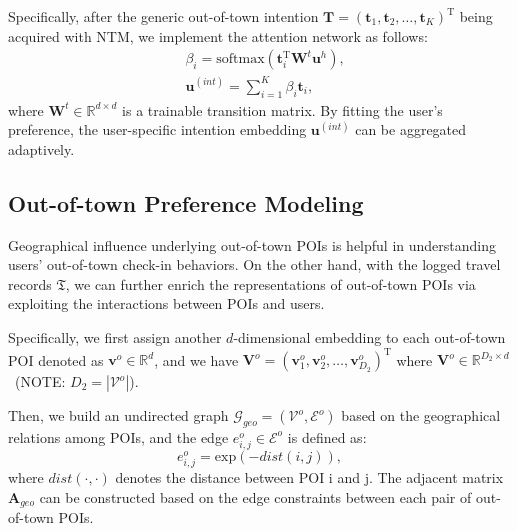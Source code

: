 \documentclass[letterpaper]{article} %
\begin{document}
Specifically, after the generic out-of-town intention 
$\mathbf{T} = 
\left(
{\mathbf{t}_1,\mathbf{t}_2,\ldots,\mathbf{t}_{K}}
\right)^{\mathrm{T}}$ being acquired with NTM, we implement the attention network as follows:
\begin{equation}\label{e:intention_embedding}
    \begin{split}
        & \beta_i = \mathrm{softmax}\left(
        \mathbf{t}_i^\mathrm{T} 
        \mathbf{W}^t
        \mathbf{u}^h
        \right)  ,
        \\
        & \mathbf{u}^{(int)} = \sum_{i=1}^{K}
        \beta_i \mathbf{t}_i  ,
    \end{split}
\end{equation}
%
where $\mathbf{W}^t \in \mathbb{R}^{d \times d}$ is a trainable transition matrix. 
By fitting the user's preference, the {user-specific} intention embedding $\mathbf{u}^{(int)}$ can be aggregated adaptively. 


\subsection{Out-of-town Preference Modeling} 
Geographical influence underlying out-of-town POIs is helpful in understanding users' out-of-town check-in behaviors. 
On the other hand, with the logged travel records $ \mathfrak{T} $, we can further enrich the representations of out-of-town POIs via exploiting the interactions between POIs and users.

Specifically, 
we first assign another $d$-dimensional embedding to each out-of-town POI denoted as $\mathbf{v}^o \in \mathbb{R}^d$,
and we have $\mathbf{V}^o = {\left(\mathbf{v}^o_1, \mathbf{v}^o_2, \ldots, \mathbf{v}^o_{D_2}\right)}^{\mathrm{T}}$ 
where 
$\mathbf{V}^o \in \mathbb{R}^{D_2 \times d}$~(NOTE: $D_2 = |\mathcal{V}^o|$).


Then, we build an undirected graph $\mathcal{G}_{geo} = (\mathcal{V}^o, \mathcal{E}^o)$ based on the geographical relations among POIs, 
and the edge $ e^o_{i, j} \in \mathcal{E}^o$ is defined as:
% 
\begin{equation}\label{e:geo_graph_edge}
    e^o_{i, j} = \mathrm{exp} \left({- dist(i,j)}\right) ,
\end{equation}
%
where $dist(\cdot,\cdot)$ denotes the distance between POI i and j. 
The adjacent matrix $\mathbf{A}_{geo}$ can be constructed based on the edge constraints between each pair of out-of-town POIs.
\end{document}
